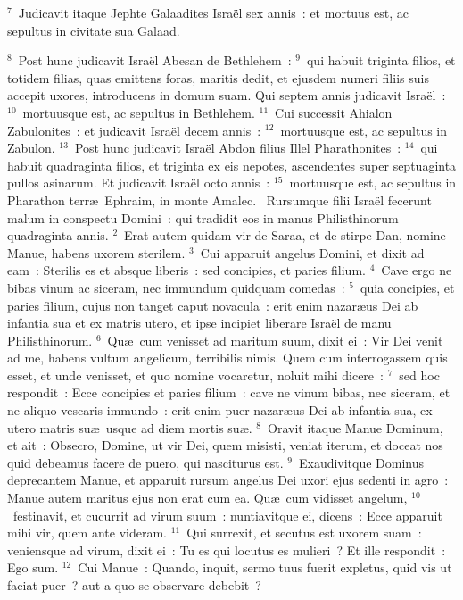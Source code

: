 ${}^{7}$~Judicavit itaque Jephte Galaadites Isra\"el sex annis~: et mortuus est, ac sepultus in civitate sua Galaad.


${}^{8}$~Post hunc judicavit Isra\"el Abesan de Bethlehem~:
${}^{9}$~qui habuit triginta filios, et totidem filias, quas emittens foras, maritis dedit, et ejusdem numeri filiis suis accepit uxores, introducens in domum suam. Qui septem annis judicavit Isra\"el~:
${}^{10}$~mortuusque est, ac sepultus in Bethlehem.
${}^{11}$~Cui successit Ahialon Zabulonites~: et judicavit Isra\"el decem annis~:
${}^{12}$~mortuusque est, ac sepultus in Zabulon.
${}^{13}$~Post hunc judicavit Isra\"el Abdon filius Illel Pharathonites~:
${}^{14}$~qui habuit quadraginta filios, et triginta ex eis nepotes, ascendentes super septuaginta pullos asinarum. Et judicavit Isra\"el octo annis~:
${}^{15}$~mortuusque est, ac sepultus in Pharathon terr\ae\ Ephraim, in monte Amalec.
~Rursumque filii Isra\"el fecerunt malum in conspectu Domini~: qui tradidit eos in manus Philisthinorum quadraginta annis.
${}^{2}$~Erat autem quidam vir de Saraa, et de stirpe Dan, nomine Manue, habens uxorem sterilem.
${}^{3}$~Cui apparuit angelus Domini, et dixit ad eam~: Sterilis es et absque liberis~: sed concipies, et paries filium.
${}^{4}$~Cave ergo ne bibas vinum ac siceram, nec immundum quidquam comedas~:
${}^{5}$~quia concipies, et paries filium, cujus non tanget caput novacula~: erit enim nazar\ae us Dei ab infantia sua et ex matris utero, et ipse incipiet liberare Isra\"el de manu Philisthinorum.
${}^{6}$~Qu\ae\ cum venisset ad maritum suum, dixit ei~: Vir Dei venit ad me, habens vultum angelicum, terribilis nimis. Quem cum interrogassem quis esset, et unde venisset, et quo nomine vocaretur, noluit mihi dicere~:
${}^{7}$~sed hoc respondit~: Ecce concipies et paries filium~: cave ne vinum bibas, nec siceram, et ne aliquo vescaris immundo~: erit enim puer nazar\ae us Dei ab infantia sua, ex utero matris su\ae\ usque ad diem mortis su\ae .
${}^{8}$~Oravit itaque Manue Dominum, et ait~: Obsecro, Domine, ut vir Dei, quem misisti, veniat iterum, et doceat nos quid debeamus facere de puero, qui nasciturus est.
${}^{9}$~Exaudivitque Dominus deprecantem Manue, et apparuit rursum angelus Dei uxori ejus sedenti in agro~: Manue autem maritus ejus non erat cum ea. Qu\ae\ cum vidisset angelum,
${}^{10}$~festinavit, et cucurrit ad virum suum~: nuntiavitque ei, dicens~: Ecce apparuit mihi vir, quem ante videram.
${}^{11}$~Qui surrexit, et secutus est uxorem suam~: veniensque ad virum, dixit ei~: Tu es qui locutus es mulieri~? Et ille respondit~: Ego sum.
${}^{12}$~Cui Manue~: Quando, inquit, sermo tuus fuerit expletus, quid vis ut faciat puer~? aut a quo se observare debebit~?


